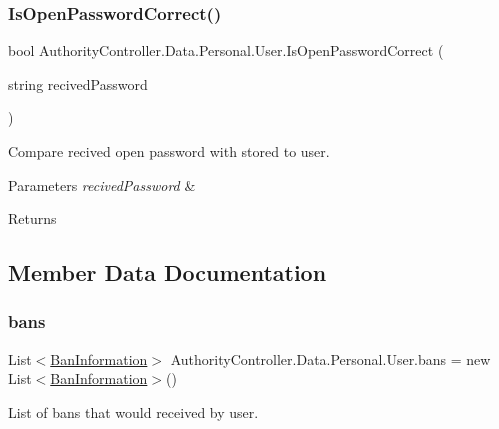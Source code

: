 \subsubsection{\texorpdfstring{Is\+Open\+Password\+Correct()}{IsOpenPasswordCorrect()}}
{\footnotesize\ttfamily bool Authority\+Controller.\+Data.\+Personal.\+User.\+Is\+Open\+Password\+Correct (\begin{DoxyParamCaption}\item[{string}]{recived\+Password }\end{DoxyParamCaption})}



Compare recived open password with stored to user. 


\begin{DoxyParams}{Parameters}
{\em recived\+Password} & \\
\hline
\end{DoxyParams}
\begin{DoxyReturn}{Returns}

\end{DoxyReturn}


\subsection{Member Data Documentation}
\mbox{\label{class_authority_controller_1_1_data_1_1_personal_1_1_user_aba2ff03e67ecf1732c4bdb625b441aac}} 
\subsubsection{\texorpdfstring{bans}{bans}}
{\footnotesize\ttfamily List$<$\mbox{\hyperlink{class_authority_controller_1_1_data_1_1_personal_1_1_ban_information}{Ban\+Information}}$>$ Authority\+Controller.\+Data.\+Personal.\+User.\+bans = new List$<$\mbox{\hyperlink{class_authority_controller_1_1_data_1_1_personal_1_1_ban_information}{Ban\+Information}}$>$()}



List of bans that would received by user. 

\mbox{\label{class_authority_controller_1_1_data_1_1_personal_1_1_user_a06913d22f1b4518cce99c356bdad38a0}} 
